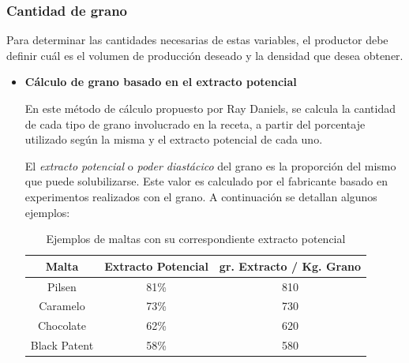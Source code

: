             
            \subsubsection{Cantidad de grano}
                \par Para determinar las cantidades necesarias de estas variables, el productor debe definir cuál es el volumen de producción deseado y la densidad que desea obtener.
                
                \begin{itemize}
                    \item \textbf{Cálculo de grano basado en el extracto potencial}
                    \par En este método de cálculo propuesto por Ray Daniels, se calcula la cantidad de cada tipo de grano involucrado en la receta, a partir del porcentaje utilizado según la misma y el extracto potencial de cada uno. 
                    
                        \par El \textit{extracto potencial} o \textit{poder diastácico} del grano es la proporción del mismo que puede solubilizarse. Este valor es calculado por el fabricante basado en experimentos realizados con el grano. A continuación se detallan algunos ejemplos: 
                        \begin{table}[H]
                            \centering
                            \begin{tabular}{| c | c | c |}
                                \hline
                                Malta & Extracto Potencial & gr. Extracto / Kg. Grano \\
                                \hline
                                \hline
                                Pilsen & 81\% & 810
                                \\\hline
                                Caramelo & 73\%  & 730
                                \\\hline
                                Chocolate & 62\% & 620
                                \\\hline
                                Black Patent & 58\% & 580
                                \\\hline
                            \end{tabular}
                            \caption{Ejemplos de maltas con su correspondiente extracto potencial}
                            \label{tab:TablaExtractoPotencial}
                        \end{table}
                        

\end{itemize}
